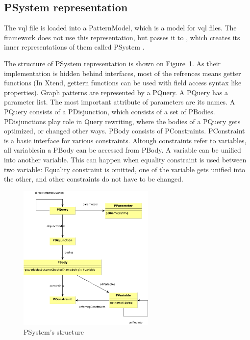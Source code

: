 \subsection{PSystem representation}
The vql file is loaded into a PatternModel, which is a model for vql files. 
The framework does not use this representation, but passes it to \viatra, which creates its inner representations of them called PSystem \cite{psystem}. 

The structure of PSystem representation is shown on Figure~\ref{fig:psystem}. 
As their implementation is hidden behind interfaces, most of the refrences means getter functions (In Xtend, gettern functions can be used with field access syntax like \csharp{} properties). 
Graph patterns are represented by a PQuery. 
A PQuery has a parameter list. 
The most important attribute of parameters are its names. 
A PQuery consists of a PDisjunction, which consists of a set of PBodies. 
PDisjunctions play role in Query rewriting, where the bodies of a PQuery gets optimized, or changed other ways.
PBody consists of PConstraints. 
PConstraint is a basic interface for various constraints. 
Altough constraints refer to variables, all variablesin a PBody can be accessed from PBody.
A variable can be unified into another variable. 
This can happen when equality constraint is used between two variable: 
Equality constraint is omitted, one of the variable gets unified into the other, and other constraints do not have to be changed.


\begin{figure}[h]
	\begin{center}
		\includegraphics[width=0.6\textwidth]{figures/psystem.pdf}
		\caption{PSystem's structure}
		\label{fig:psystem}
	\end{center}
\end{figure}

